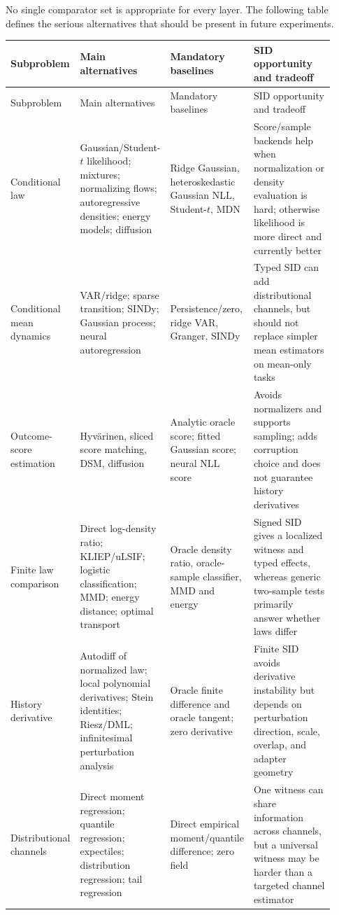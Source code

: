 \documentclass[10pt]{article}
\begin{document}
No single comparator set is appropriate for every layer. The following table defines the serious alternatives that should be present in future experiments.

\begin{longtable}{@{}p{0.16\linewidth}p{0.24\linewidth}p{0.25\linewidth}p{0.27\linewidth}@{}}
\toprule
Subproblem & Main alternatives & Mandatory baselines & SID opportunity and tradeoff \\
\midrule
\endfirsthead
\toprule
Subproblem & Main alternatives & Mandatory baselines & SID opportunity and tradeoff \\
\midrule
\endhead
Conditional law & Gaussian/Student-\(t\) likelihood; mixtures; normalizing flows; autoregressive densities; energy models; diffusion & Ridge Gaussian, heteroskedastic Gaussian NLL, Student-\(t\), MDN & Score/sample backends help when normalization or density evaluation is hard; otherwise likelihood is more direct and currently better \\
Conditional mean dynamics & VAR/ridge; sparse transition; SINDy; Gaussian process; neural autoregression & Persistence/zero, ridge VAR, Granger, SINDy & Typed SID can add distributional channels, but should not replace simpler mean estimators on mean-only tasks \\
Outcome-score estimation & Hyv\"arinen, sliced score matching, DSM, diffusion & Analytic oracle score; fitted Gaussian score; neural NLL score & Avoids normalizers and supports sampling; adds corruption choice and does not guarantee history derivatives \\
Finite law comparison & Direct log-density ratio; KLIEP/uLSIF; logistic classification; MMD; energy distance; optimal transport & Oracle density ratio, oracle-sample classifier, MMD and energy & Signed SID gives a localized witness and typed effects, whereas generic two-sample tests primarily answer whether laws differ \\
History derivative & Autodiff of normalized law; local polynomial derivatives; Stein identities; Riesz/DML; infinitesimal perturbation analysis & Oracle finite difference and oracle tangent; zero derivative & Finite SID avoids derivative instability but depends on perturbation direction, scale, overlap, and adapter geometry \\
Distributional channels & Direct moment regression; quantile regression; expectiles; distribution regression; tail regression & Direct empirical moment/quantile difference; zero field & One witness can share information across channels, but a universal witness may be harder than a targeted channel estimator \\

\end{longtable}
\end{document}
